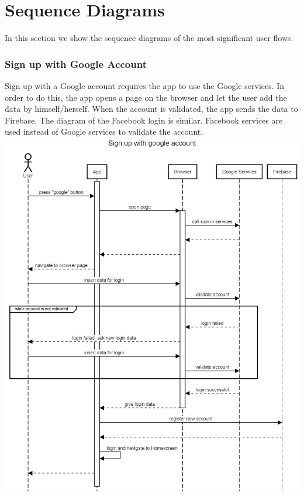 \documentclass[10pt]{article}
\begin{document}
    \newpage
	\section{Sequence Diagrams}
	In this section we show the sequence diagrams of the most significant user flows.
	\subsubsection{Sign up with Google Account}
	Sign up with a Google account requires the app to use the Google services. In order to do this, the app opens a page on the browser and let the user add the data by himself/herself. When the account is validated, the app sends the data to Firebase.
	The diagram of the Facebook login is similar. Facebook services are used instead of Google services to validate the account.
	\newline
	\newline
	\newline
	\includegraphics[scale=0.30]{resources/SignUpGoogle.png}
	\newpage
\end{document}
